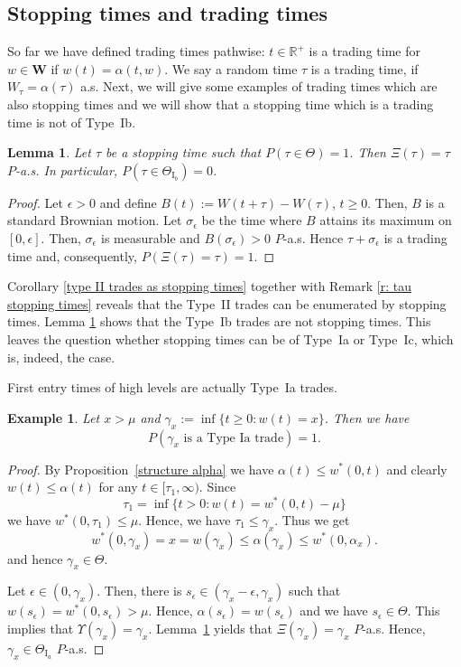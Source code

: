 \documentclass[11pt]{scrartcl}
\newtheorem{example}[theorem]{Example}
\newtheorem{lemma}[theorem]{Lemma}
\newcommand{\lasttrade}{\Upsilon}
\newcommand{\nexttrade}{\Xi}
\begin{document}
\subsection{Stopping times and trading times}

So far we have defined trading times pathwise: $t\in \mathbb{R}^{+}$ is a
trading time for $w\in \mathbf{W}$ if $w(t)=\alpha (t,w)$. We say a random
time $\tau $ is a trading time, if $W_{\tau}=\alpha (\tau)$ a.s. Next, we will give
some examples of trading times which are also stopping times and we will
show that a stopping time which is a trading time is not of Type~{Ib}.

\begin{lemma}
\label{stopping times not 1b} Let $\tau$ be a stopping time such that $P(\tau\in\Theta)=1$. Then $\Xi(\tau)=\tau$ $P$-a.s. In particular, $P(\tau\in\Theta_{\mathrm{I}_b})=0$.
\end{lemma}

\begin{proof}
  Let $\epsilon >0$ and define $B(t):=W(t+\tau)-W(\tau)$, $t\geq0$. 
  Then, $B$ is a standard Brownian motion. Let $\sigma_\epsilon$ be the 
  time where $B$ attains its maximum on $[0,\epsilon]$. Then, 
  $\sigma_\epsilon$ is measurable and $B(\sigma_\epsilon)>0$ $P$-a.s. 
  Hence $\tau+\sigma_\epsilon$ is a trading time and, consequently, 
  $P(\nexttrade(\tau)=\tau)=1$.
\end{proof}Corollary \ref{type II trades as stopping times} together with
Remark \ref{r: tau stopping times} reveals that the Type~{II} trades can be
enumerated by stopping times. Lemma \ref{stopping times not 1b} shows that
the Type~{Ib} trades are not stopping times. This leaves the question
whether stopping times can be of Type~{Ia} or Type~{Ic}, which is, indeed,
the case.

First entry times of high levels are actually Type~{Ia} trades.

\begin{example}
Let $x > \mu$ and $\gamma_x:=\inf\{t\geq 0: w(t) = x\}$. Then we have 
\begin{equation*}
P(\gamma_x \text{ is a Type~{Ia} trade}) = 1.
\end{equation*}
\end{example}

\begin{proof}
  By Proposition~\ref{structure alpha} we have $\alpha(t) \leq w^*(0,t)$ and
  clearly $w(t)\leq \alpha(t)$ for any $t\in[\tau_1,\infty)$. Since 
  $$\tau_1 = \inf\{t>0: w(t) = w^*(0,t)-\mu\}$$
 we have $w^*(0,\tau_1)\leq \mu$. Hence, we have $\tau_1\leq \gamma_x$. Thus we get
  $$ w^*(0,\gamma_x)=x=w(\gamma_x) \leq \alpha(\gamma_x)\leq w^*(0,\alpha_x). $$
 and hence $\gamma_x\in\Theta$.
 
  Let $\epsilon\in(0,\gamma_x)$. Then, there is $s_\epsilon\in(\gamma_x-\epsilon,\gamma_x)$ 
  such that $w(s_\epsilon) = w^*(0,s_\epsilon)>\mu$. Hence, $\alpha(s_\epsilon)=w(s_\epsilon)$ and 
  we have $s_\epsilon\in\Theta$. This implies that $\lasttrade(\gamma_x) = \gamma_x$. 
  Lemma~\ref{stopping times not 1b} yields that $\nexttrade(\gamma_x)=\gamma_x$ $P$-a.s. Hence, $\gamma_x\in\Theta_{\mathrm{I}_a}$ $P$-a.s.
\end{proof}
\end{document}
